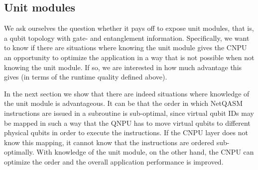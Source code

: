 \subsection{Unit modules}
\label{netqasm:sec:evaluation-unit-modules}
We ask ourselves the question whether it pays off to expose unit modules, that is, a qubit topology with gate- and entanglement information.
Specifically, we want to know if there are situations where knowing the unit module gives the \ac{CNPU} an opportunity to optimize the application in a way that is not possible when not knowing the unit module.
If so, we are interested in how much advantage this gives (in terms of the runtime quality defined above).

In the next section we show that there are indeed situations where knowledge of the unit module is advantageous.
It can be that the order in which \ac{NetQASM} instructions are issued in a subroutine is sub-optimal, since virtual qubit IDs may be mapped in such a way that the \ac{QNPU} has to move virtual qubits to different physical qubits in order to execute the instructions.
If the \ac{CNPU} layer does not know this mapping, it cannot know that the instructions are ordered sub-optimally.
With knowledge of the unit module, on the other hand, the \ac{CNPU} can optimize the order and the overall application performance is improved.

